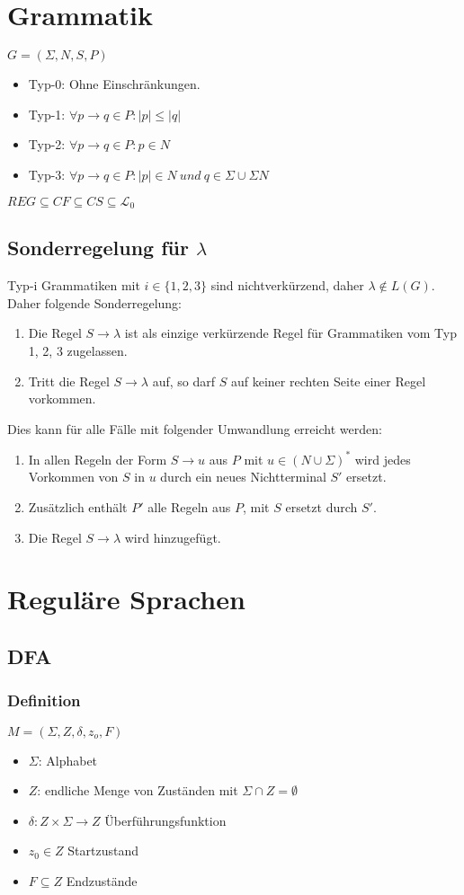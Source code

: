 \documentclass[9pt]{article}
\begin{document}
\section{Grammatik}
$G = (\Sigma, N, S, P)$
\begin{itemize}
	\item Typ-0: Ohne Einschränkungen.
	\item Typ-1: $\forall p \rightarrow q \in P : |p| \leq |q|$ 
	\item Typ-2: $\forall p \rightarrow q \in P : p \in N$ 
	\item Typ-3: $\forall p \rightarrow q \in P : |p| \in N \ und\ q \in \Sigma \cup \Sigma N$ 
\end{itemize}
$REG \subseteq CF \subseteq CS \subseteq \mathcal{L}_0$
\subsection{Sonderregelung für $\lambda$}
Typ-i Grammatiken mit $i\in \{1, 2, 3\}$ sind nichtverkürzend, daher $\lambda \notin L(G)$. Daher folgende Sonderregelung:
\begin{enumerate}
	\item Die Regel $S \rightarrow \lambda$ ist als einzige verkürzende Regel für Grammatiken vom Typ 1, 2, 3 zugelassen.
	\item Tritt die Regel $S \rightarrow \lambda$ auf, so darf $S$ auf keiner rechten Seite einer Regel vorkommen.
\end{enumerate}
Dies kann für alle Fälle mit folgender Umwandlung erreicht werden:
\begin{enumerate}
	\item In allen Regeln der Form $S \rightarrow u$ aus $P$ mit $u \in (N \cup \Sigma)^*$ wird jedes Vorkommen von $S$ in $u$ durch ein neues Nichtterminal $S'$ ersetzt.
	\item Zusätzlich enthält $P'$ alle Regeln aus $P$, mit $S$ ersetzt durch $S'$.
	\item Die Regel $S \rightarrow \lambda$ wird hinzugefügt.
\end{enumerate}
\section{Reguläre Sprachen}
\subsection{DFA}
\subsubsection{Definition}
$M=(\Sigma, Z, \delta, z_o, F)$
\begin{itemize}
	\item $\Sigma$: Alphabet
	\item $Z$: endliche Menge von Zuständen mit $\Sigma \cap Z = \emptyset$
	\item $\delta: Z \times \Sigma \rightarrow Z$ Überführungsfunktion
	\item $z_0 \in Z$ Startzustand
	\item $F \subseteq Z$ Endzustände
\end{itemize}
\end{document}
